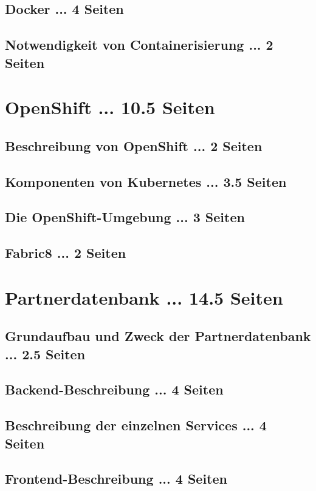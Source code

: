 \documentclass[master,german]{hgbthesis}
\begin{document}
\section{Docker ... 4 Seiten}
\section{Notwendigkeit von Containerisierung ... 2 Seiten}


\chapter{OpenShift ... 10.5 Seiten}
\section{Beschreibung von OpenShift ... 2 Seiten}
\section{Komponenten von Kubernetes ... 3.5 Seiten}
\section{Die OpenShift-Umgebung ... 3 Seiten}
\section{Fabric8 ... 2 Seiten}

\chapter{Partnerdatenbank ... 14.5 Seiten}
\section{Grundaufbau und Zweck der Partnerdatenbank ... 2.5 Seiten}
\section{Backend-Beschreibung ... 4 Seiten}
\section{Beschreibung der einzelnen Services ... 4 Seiten}
\section{Frontend-Beschreibung ... 4 Seiten}
\end{document}
